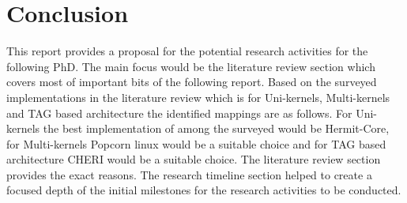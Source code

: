 
\chapter{Conclusion}  %
This report provides a proposal for the potential research 
activities for the following PhD. The main focus would be 
the literature review section which covers most of important 
bits of the following report. Based on the surveyed implementations 
in the literature review which is for Uni-kernels, Multi-kernels 
and TAG based architecture the identified mappings are as follows.
For Uni-kernels the best implementation of among the surveyed would be Hermit-Core, for Multi-kernels 
Popcorn linux would be a suitable choice and for TAG based architecture
CHERI would be a suitable choice. The literature review section
provides the exact reasons. The research timeline section helped
to create a focused depth of the initial milestones for the research 
activities to be conducted.